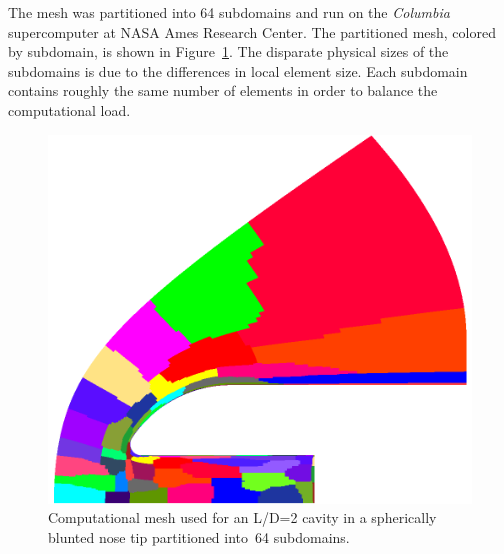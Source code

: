 \clearpage
The mesh was partitioned into 64 subdomains and run on the \emph{Columbia} supercomputer at NASA Ames Research Center.  The partitioned mesh, colored by subdomain, is shown in Figure~\ref{fig:cavity_mesh_partition}. The disparate physical sizes of the subdomains is due to the differences in local element size.  Each subdomain contains roughly the same number of elements in order to balance the computational load.
\begin{figure}[hbtp]
  \begin{center}
    \includegraphics[width=\textwidth]{figures/sphere_cavity/LD_2.0/partition}
    \caption{Computational mesh used for an L/D=2 cavity in a spherically blunted nose tip partitioned into~64 subdomains.\label{fig:cavity_mesh_partition}}
  \end{center}
\end{figure}

\clearpage

